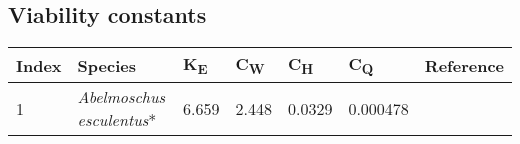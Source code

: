 \documentclass[]{article}
\begin{document}
\hypertarget{viability-constants}{%
\subsection{Viability constants}\label{viability-constants}}

\renewcommand{\arraystretch}{1.3}

\begin{longtable}[]{@{}lllllll@{}}
\toprule
\begin{minipage}[b]{0.05\columnwidth}\raggedright
Index\strut
\end{minipage} & \begin{minipage}[b]{0.23\columnwidth}\raggedright
Species\strut
\end{minipage} & \begin{minipage}[b]{0.05\columnwidth}\raggedright
K\textsubscript{E}\strut
\end{minipage} & \begin{minipage}[b]{0.08\columnwidth}\raggedright
C\textsubscript{W}\strut
\end{minipage} & \begin{minipage}[b]{0.08\columnwidth}\raggedright
C\textsubscript{H}\strut
\end{minipage} & \begin{minipage}[b]{0.08\columnwidth}\raggedright
C\textsubscript{Q}\strut
\end{minipage} & \begin{minipage}[b]{0.23\columnwidth}\raggedright
Reference\strut
\end{minipage}\tabularnewline
\midrule
\endhead
\begin{minipage}[t]{0.05\columnwidth}\raggedright
1\strut
\end{minipage} & \begin{minipage}[t]{0.23\columnwidth}\raggedright
\emph{Abelmoschus esculentus}*\strut
\end{minipage} & \begin{minipage}[t]{0.05\columnwidth}\raggedright
6.659\strut
\end{minipage} & \begin{minipage}[t]{0.08\columnwidth}\raggedright
2.448\strut
\end{minipage} & \begin{minipage}[t]{0.08\columnwidth}\raggedright
0.0329\strut
\end{minipage} & \begin{minipage}[t]{0.08\columnwidth}\raggedright
0.000478\strut

\end{minipage}
\end{longtable}
\end{document}
